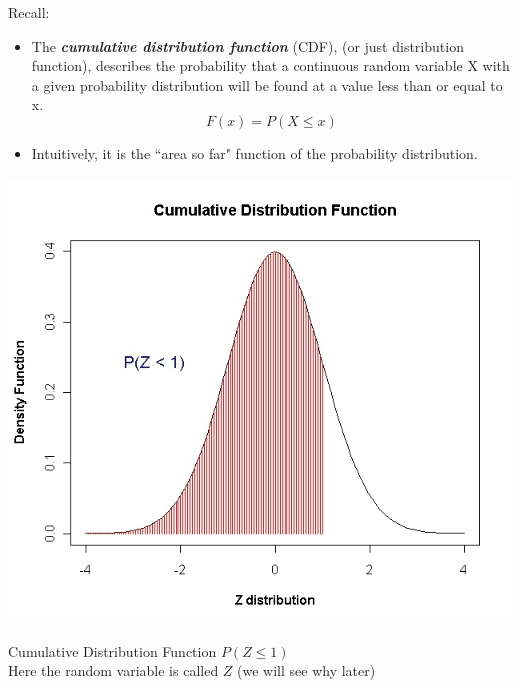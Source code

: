\documentclass[12pt]{report}
\begin{document}
{\LARGE
	Recall:
	\begin{itemize}
		\item The \textbf{\emph{cumulative distribution function}} (CDF), (or just distribution function), describes the probability that a continuous random variable X with a given probability distribution will be found at a value less than or equal to x.\\
		
		\[ F(x) = P(X \leq x) \]
		
		\item Intuitively, it is the ``area so far" function of the probability distribution.
	\end{itemize}
}
\vspace{-0.5cm}
\begin{center}
	\includegraphics[scale=0.35]{images/6ACDF}
\end{center}
Cumulative Distribution Function $P(Z \leq 1)$ \\ Here the random variable is called $Z$ (we will see why later)
\end{document}
